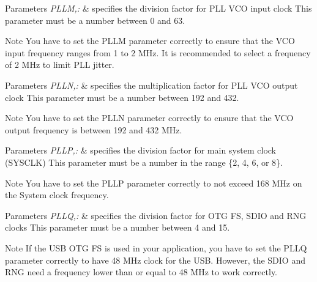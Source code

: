 \begin{DoxyParams}{Parameters}
{\em P\-L\-L\-M,\-:} & specifies the division factor for P\-L\-L V\-C\-O input clock This parameter must be a number between 0 and 63. \\
\hline
\end{DoxyParams}
\begin{DoxyNote}{Note}
You have to set the P\-L\-L\-M parameter correctly to ensure that the V\-C\-O input frequency ranges from 1 to 2 M\-Hz. It is recommended to select a frequency of 2 M\-Hz to limit P\-L\-L jitter.
\end{DoxyNote}

\begin{DoxyParams}{Parameters}
{\em P\-L\-L\-N,\-:} & specifies the multiplication factor for P\-L\-L V\-C\-O output clock This parameter must be a number between 192 and 432. \\
\hline
\end{DoxyParams}
\begin{DoxyNote}{Note}
You have to set the P\-L\-L\-N parameter correctly to ensure that the V\-C\-O output frequency is between 192 and 432 M\-Hz.
\end{DoxyNote}

\begin{DoxyParams}{Parameters}
{\em P\-L\-L\-P,\-:} & specifies the division factor for main system clock (S\-Y\-S\-C\-L\-K) This parameter must be a number in the range \{2, 4, 6, or 8\}. \\
\hline
\end{DoxyParams}
\begin{DoxyNote}{Note}
You have to set the P\-L\-L\-P parameter correctly to not exceed 168 M\-Hz on the System clock frequency.
\end{DoxyNote}

\begin{DoxyParams}{Parameters}
{\em P\-L\-L\-Q,\-:} & specifies the division factor for O\-T\-G F\-S, S\-D\-I\-O and R\-N\-G clocks This parameter must be a number between 4 and 15. \\
\hline
\end{DoxyParams}
\begin{DoxyNote}{Note}
If the U\-S\-B O\-T\-G F\-S is used in your application, you have to set the P\-L\-L\-Q parameter correctly to have 48 M\-Hz clock for the U\-S\-B. However, the S\-D\-I\-O and R\-N\-G need a frequency lower than or equal to 48 M\-Hz to work correctly.
\end{DoxyNote}


